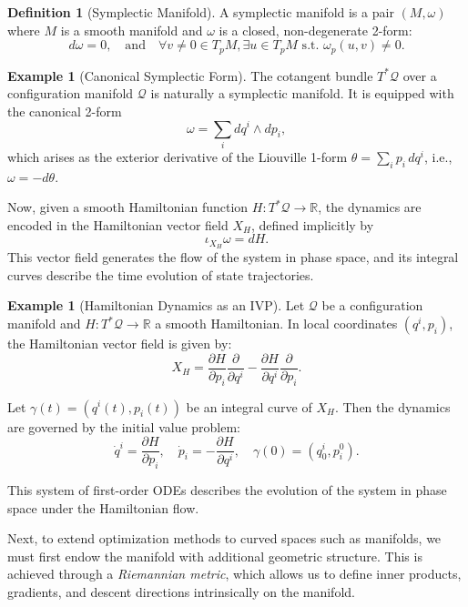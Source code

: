 \documentclass{article}
\theoremstyle{plain}
\theoremstyle{definition}
\newtheorem{definition}[theorem]{Definition}
\newtheorem{example}[theorem]{Example}
\theoremstyle{remark}
\begin{document}
\begin{definition}[Symplectic Manifold]
A symplectic manifold is a pair $(M, \omega)$ where $M$ is a smooth manifold and $\omega$ is a closed, non-degenerate 2-form:
\[
d\omega = 0, \quad \text{and} \quad \forall v \neq 0 \in T_p M, \exists u \in T_p M \text{ s.t. } \omega_p(u, v) \neq 0.
\]
\end{definition}

\begin{example}[Canonical Symplectic Form]
The cotangent bundle $T^*\mathcal{Q}$ over a configuration manifold $\mathcal{Q}$ is naturally a symplectic manifold. It is equipped with the canonical 2-form
\[
\omega = \sum_i dq^i \wedge dp_i,
\]
which arises as the exterior derivative of the Liouville 1-form $\theta = \sum_i p_i \, dq^i$, i.e., $\omega = -d\theta$.
\end{example}

Now, given a smooth Hamiltonian function $H: T^*\mathcal{Q} \to \mathbb{R}$, the dynamics are encoded in the Hamiltonian vector field $X_H$, defined implicitly by
\[
\iota_{X_H} \omega = dH.
\]
This vector field generates the flow of the system in phase space, and its integral curves describe the time evolution of state trajectories.

\begin{example}[Hamiltonian Dynamics as an IVP]
Let $\mathcal{Q}$ be a configuration manifold and $H: T^*\mathcal{Q} \to \mathbb{R}$ a smooth Hamiltonian. In local coordinates $(q^i, p_i)$, the Hamiltonian vector field is given by:
\[
X_H = \frac{\partial H}{\partial p_i} \frac{\partial}{\partial q^i} - \frac{\partial H}{\partial q^i} \frac{\partial}{\partial p_i}.
\]

Let $\gamma(t) = (q^i(t), p_i(t))$ be an integral curve of $X_H$. Then the dynamics are governed by the initial value problem:
\[
\dot{q}^i = \frac{\partial H}{\partial p_i}, \quad \dot{p}_i = -\frac{\partial H}{\partial q^i}, \quad \gamma(0) = (q_0^i, p_i^0).
\]

This system of first-order ODEs describes the evolution of the system in phase space under the Hamiltonian flow.
\end{example}

Next, to extend optimization methods to curved spaces such as manifolds, we must first endow the manifold with additional geometric structure. This is achieved through a \emph{Riemannian metric}, which allows us to define inner products, gradients, and descent directions intrinsically on the manifold.
\end{document}

